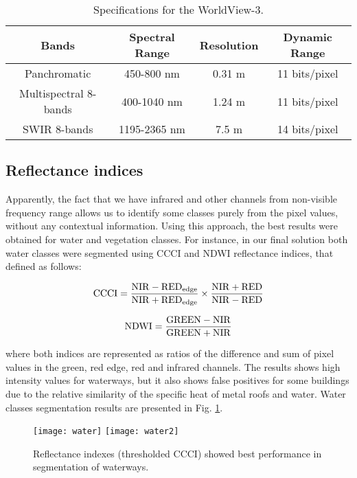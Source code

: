\documentclass[10pt,twocolumn,letterpaper]{article}
\begin{document}
\begin{table*}[th]
	\centering
	\begin{tabular}{|c|c|c|c|}
		\hline
		\textbf{Bands} & \textbf{Spectral Range} & \textbf{Resolution} & \textbf{Dynamic Range} \\ \hline
		Panchromatic & 450-800 nm & 0.31 m & 11 bits/pixel\\ \hline
		Multispectral 8-bands & 400-1040 nm & 1.24 m & 11 bits/pixel \\ \hline
		SWIR 8-bands & 1195-2365 nm & 7.5 m & 14 bits/pixel\\ \hline
	\end{tabular}
	\caption{Specifications for the WorldView-3.}
	\label{table:specs}
\end{table*}


\subsection{Reflectance indices}
\label{subsec:reflectance}

Apparently, the fact that we have infrared and other channels from non-visible frequency range allows us to identify some classes purely from the pixel values, without any contextual information. Using this approach, the best results were obtained for water and vegetation classes. For instance, in our final solution both water classes were segmented using CCCI \cite{ccci} and NDWI reflectance indices, that defined as follows:

\begin{equation}
{\rm CCCI} = \frac{{\rm NIR} - {\rm RED}_{\rm edge}}{{\rm NIR} + {\rm RED}_{\rm edge}}\times{\frac{{\rm NIR} + {\rm RED}}{{\rm NIR} - {\rm RED}}}
\end{equation}

\begin{equation}
{\rm NDWI} = \frac{{\rm GREEN} - {\rm NIR}}{{\rm GREEN} + {\rm NIR}}
\end{equation}

\noindent where both indices are represented as ratios of the difference and sum of pixel values in the green, red edge, red and infrared channels. The results shows high intensity values for waterways, but it also shows false positives for some buildings due to the relative similarity of the specific heat of metal roofs and water. Water classes segmentation results are presented in Fig. \ref{fig:ccci}.

\begin{figure}[!h]
	\captionsetup{justification=centering}
	\centering
	\texttt{[image: water]}
	\texttt{[image: water2]}
	\caption{ Reflectance indexes (thresholded CCCI) showed best performance in segmentation of waterways.}
	\label{fig:ccci}
\end{figure}
\end{document}
